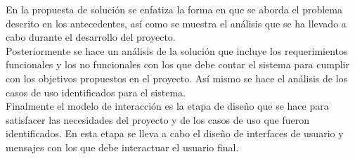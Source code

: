 En la propuesta de solución se enfatiza la forma en que se aborda el problema descrito en los antecedentes, así como se muestra el análisis que se ha llevado a cabo durante el desarrollo del proyecto. \\

Posteriormente se hace un análisis de la solución que incluye los requerimientos funcionales y los no funcionales con los que debe contar el sistema para cumplir con los objetivos propuestos en el proyecto. Así mismo se hace el análisis de los casos de uso identificados para el sistema. \\

Finalmente el modelo de interacción es la etapa de diseño que se hace para satisfacer las necesidades del proyecto y de los casos de uso que fueron identificados. En esta etapa se lleva a cabo el diseño de interfaces de usuario y mensajes con los que debe interactuar el usuario final.
%
%
%
%	
%	
%
%	
%

